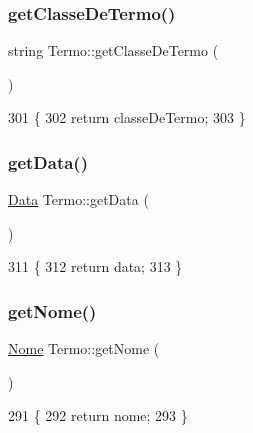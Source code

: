 \subsubsection{\texorpdfstring{get\+Classe\+De\+Termo()}{getClasseDeTermo()}}
{\footnotesize\ttfamily string Termo\+::get\+Classe\+De\+Termo (\begin{DoxyParamCaption}{ }\end{DoxyParamCaption})\hspace{0.3cm}{\ttfamily [inline]}}


\begin{DoxyCode}
301   \{
302     \textcolor{keywordflow}{return} classeDeTermo;
303   \}
\end{DoxyCode}
\mbox{\label{class_termo_a1357b045369299a02496810cf2db5a49}} 
\subsubsection{\texorpdfstring{get\+Data()}{getData()}}
{\footnotesize\ttfamily \mbox{\hyperlink{class_data}{Data}} Termo\+::get\+Data (\begin{DoxyParamCaption}{ }\end{DoxyParamCaption})\hspace{0.3cm}{\ttfamily [inline]}}


\begin{DoxyCode}
311   \{
312     \textcolor{keywordflow}{return} data;
313   \}
\end{DoxyCode}
\mbox{\label{class_termo_a5a871aa897b85c895adc9fb2329a15d5}} 
\subsubsection{\texorpdfstring{get\+Nome()}{getNome()}}
{\footnotesize\ttfamily \mbox{\hyperlink{class_nome}{Nome}} Termo\+::get\+Nome (\begin{DoxyParamCaption}{ }\end{DoxyParamCaption})\hspace{0.3cm}{\ttfamily [inline]}}


\begin{DoxyCode}
291   \{
292     \textcolor{keywordflow}{return} nome;
293   \}
\end{DoxyCode}
\mbox{\label{class_termo_a8c32e501b39e008ea369650e3eb196b1}} 
